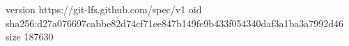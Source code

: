 version https://git-lfs.github.com/spec/v1
oid sha256:d27a076697cabbe82d74cf71ee847b149fe9b433f054340daf3a1ba3a7992d46
size 187630

